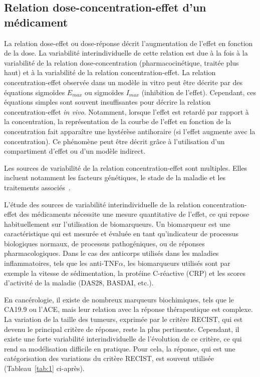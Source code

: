 \subsection{Relation dose-concentration-effet d'un médicament}
La relation dose-effet ou dose-réponse décrit l'augmentation de l'effet en fonction de la dose. La variabilité interindividuelle de cette relation est due à la fois à la variabilité de la relation dose-concentration (pharmacocinétique, traitée plus haut) et à la variabilité de la relation concentration-effet. La relation concentration-effet observée dans un modèle in vitro peut être décrite par des équations sigmoïdes $E_{max}$ ou sigmoïdes $I_{max}$ (inhibition de l'effet). Cependant, ces équations simples sont souvent insuffisantes pour décrire la relation concentration-effet \textit{in vivo}. Notamment, lorsque l'effet est retardé par rapport à la concentration, la représentation de la courbe de l'effet en fonction de la concentration fait apparaître une hystérèse antihoraire (si l'effet augmente avec la concentration). Ce phénomène peut être décrit grâce à l'utilisation d'un compartiment d'effet ou d'un modèle indirect.

Les sources de variabilité de la relation concentration-effet sont multiples. Elles incluent notamment les facteurs génétiques, le stade de la maladie et les traitements associés~\citep{REF7}.

L'étude des sources de variabilité interindividuelle de la relation concentration-effet des médicaments nécessite une mesure quantitative de l'effet, ce qui repose habituellement sur l'utilisation de biomarqueurs. Un biomarqueur est une caractéristique qui est mesurée et évaluée en tant qu'indicateur de processus biologiques normaux, de processus pathogéniques, ou de réponses pharmacologiques. Dans le cas des anticorps utilisés dans les maladies inflammatoires, tels que les anti-TNF$\alpha$, les biomarqueurs utilisés sont par exemple la vitesse de sédimentation, la protéine C-réactive (CRP) et les scores d'activité de la maladie (DAS28, BASDAI, etc.).

En cancérologie, il existe de nombreux marqueurs biochimiques, tels que le CA19.9 ou l'ACE, mais leur relation avec la réponse thérapeutique est complexe. La variation de la taille des tumeurs, exprimée par le critère RECIST, qui est devenu le principal critère de réponse, reste la plus pertinente. Cependant, il existe une forte variabilité interindividuelle de l'évolution de ce critère, ce qui rend sa modélisation difficile en pratique. Pour cela, la réponse, qui est une catégorisation des variations du critère RECIST, est souvent utilisée  (Tableau~\ref{tab:1} ci-après). 

